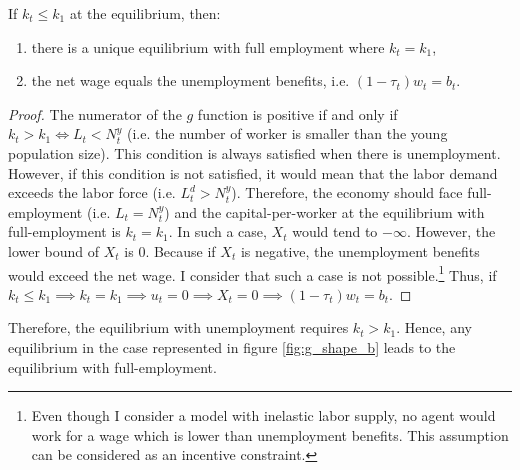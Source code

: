 	\begin{proposition}\label{prop:full_emp}
		If $k_t \leq k_1$ at the equilibrium, then:
		\begin{enumerate}[label=(\roman*)]
			\item there is a unique equilibrium with full employment where $k_t = k_1$,
			\item the net wage equals the unemployment benefits, i.e. $(1-\tau_t)w_t = b_t$.
		\end{enumerate} 
	\end{proposition}
	\begin{proof}
		The numerator of the $g$ function is positive if and only if $k_t > k_1 \Leftrightarrow L_t < N_t^y$ (i.e. the number of worker is smaller than the young population size). This condition is always satisfied when there is unemployment. However, if this condition is not satisfied, it would mean that the labor demand exceeds the labor force (i.e. $L_t^d > N_t^y$). Therefore, the economy should face full-employment (i.e. $L_t = N_t^y$) and the capital-per-worker at the equilibrium with full-employment is $k_t = k_1$. In such a case, $X_t$ would tend to  $-\infty$. However, the lower bound of $X_t$ is $0$. Because if $X_t$ is negative, the unemployment benefits would exceed the net wage. I consider that such a case is not possible.\footnote{Even though I consider a model with inelastic labor supply, no agent would work for a wage which is lower than unemployment benefits. This assumption can be considered as an incentive constraint.} Thus, if $k_t \leq k_1 \implies k_t = k_1 \implies u_t = 0 \implies X_t = 0 \implies (1-\tau_t)w_t = b_t$.
	\end{proof}

Therefore, the equilibrium with unemployment requires $k_t > k_1$. Hence, any equilibrium in the case represented in figure \ref{fig:g_shape_b} leads to the equilibrium with full-employment.

